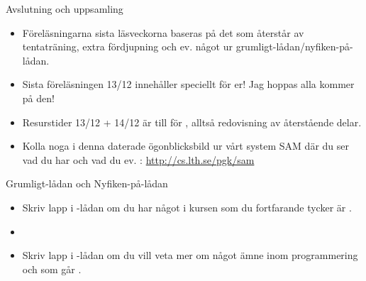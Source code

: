 \begin{Slide}{Avslutning och uppsamling}
\begin{itemize}

\item Föreläsningarna sista läsveckorna baseras på det som återstår av tentaträning, extra fördjupning och ev. något ur grumligt-lådan/nyfiken-på-lådan.
\item Sista föreläsningen 13/12 innehåller   speciellt för er! Jag hoppas alla kommer på den!

\item Resurstider 13/12 + 14/12 är till för , alltså redovisning av återstående delar.
\item Kolla noga i denna daterade ögonblicksbild ur vårt system SAM där du ser vad du har  och vad du ev. : \url{http://cs.lth.se/pgk/sam}
\end{itemize}
\end{Slide}


\begin{Slide}{Grumligt-lådan och Nyfiken-på-lådan}
\begin{itemize}
\item Skriv lapp i -lådan om du har något  i kursen som du fortfarande tycker är .

\item[]

\item Skriv lapp i -lådan om du vill veta mer om något ämne inom programmering och som går .
\end{itemize}
\end{Slide}
